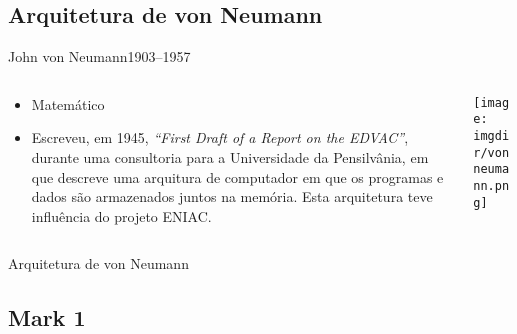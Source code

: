 \subsection{Arquitetura de von Neumann}

\begin{frame}{John von Neumann}{1903--1957}

\begin{columns}

\begin{column}{.6\textwidth}

\begin{itemize}
\item Matemático
\item Escreveu, em 1945,
  {\em ``First Draft of a Report on the EDVAC''}, durante uma consultoria para a
  Universidade da Pensilvânia, em que descreve uma arquitura de
  computador em que os programas e dados são armazenados juntos na
  memória. Esta arquitetura teve influência do projeto ENIAC.
\end{itemize}

\end{column}

\begin{column}{.4\textwidth}
\texttt{[image: \\imgdir/vonneumann.png]}
\end{column}

\end{columns}

\end{frame}

\begin{frame}{Arquitetura de von Neumann}

\end{frame}

\subsection{Mark 1}

